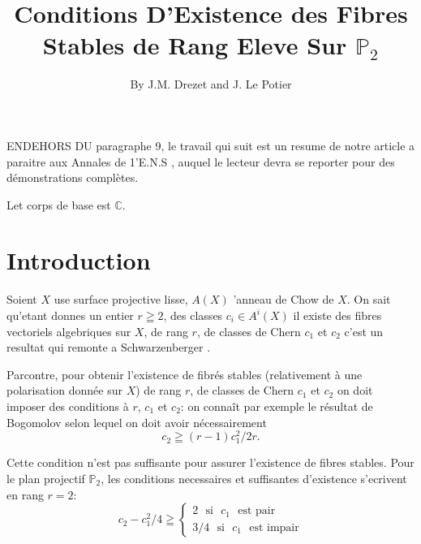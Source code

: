 \title{Conditions D'Existence des Fibres Stables de Rang Eleve Sur $\mathbb{P}_{2}$}\label{chap5}

\author{By J.M. Drezet and J. Le Potier}

\date{}
\maketitle

\setcounter{page}{97}

\setcounter{pageoriginal}{132}
EN\pageoriginale DEHORS DU paragraphe 9, le travail qui suit est un
resume de notre article a paraitre aux Annales de
1'E.N.S \cite{chap5-key4}, auquel le lecteur devra se reporter pour
des d\'emonstrations compl\`etes. 

Let corps de base est $\mathbb{C}$.

\section{Introduction}\label{chap5-sec1}

Soient $X$ use surface projective lisse, $A(X)$ 'anneau de Chow de
$X$. On sait qu'etant donnes un entier $r\geqq 2$, des classes
$c_{i}\in A^{i}(X)$ il existe des fibres vectoriels algebriques sur
$X$, de rang $r$, de classes de Chern $c_{1}$ et $c_{2}$ c'est un
resultat qui remonte a Schwarzenberger \cite{chap5-key13}. 

Par\pageoriginale contre, pour obtenir l'existence de fibr\'es stables
(relativement \`a une polarisation donn\'ee sur $X$) de rang $r$, de
classes de Chern $c_{1}$ et $c_{2}$ on doit imposer des conditions \`a
$r$, $c_{1}$ et $c_{2}$: on conna\^it par exemple le r\'esultat de
Bogomolov selon lequel on doit avoir n\'ecessairement
$$
c_{2}\geqq (r-1)c^{2}_{1}/2r.
$$

Cette condition n'est pas suffisante pour assurer l'existence de
fibres stables. Pour le plan projectif $\mathbb{P}_{2}$, les
conditions necessaires et suffisantes d'existence s'ecrivent en rang
$r=2$:
$$
c_{2}-c^{2}_{1}/4 \geqq 
\begin{cases}
2\text{~ si~ } c_{1}\text{~ est pair}\\
3/4\text{~ si~ } c_{1}\text{~ est impair}
\end{cases}
$$

